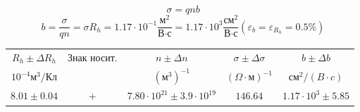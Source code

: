 \documentclass[a4paper, 12pt]{article}
\begin{document}
\begin{equation}
    \sigma = qnb
\end{equation}
\begin{equation}
    b = \frac{\sigma}{qn} = \sigma R_h = 1.17 \cdot 10^{-1}
    \frac{\text{м}^2}{\text{В} \cdot \text{с}}
    = 1.17 \cdot 10^3 \frac{\text{см}^2}{\text{В} \cdot \text{с}}
    (\varepsilon_{b} = \varepsilon_{R_h} = 0.5\%)
\end{equation}

\centering
\begin{tabular}{|c|c|c|c|c|}
    \toprule
    $R_h \pm \Delta R_h$ & Знак носит. & $n \pm \Delta n$ & $\sigma \pm \Delta \sigma$ & $b \pm \Delta b$ \\
    $10^{-4} \text{м}^3/\text{Кл}$ & & $(\text{м}^3)^{-1}$ & $(\Omega \cdot \text{м})^{-1}$ & $\text{см}^2/(B \cdot c)$ \\
    \midrule
    $8.01 \pm 0.04$ & + & $7.80 \cdot 10^{21} \pm 3.9 \cdot 10^{19}$ & $146.64$ & $1.17 \cdot 10^3 \pm 5.85$ \\
    \bottomrule
\end{tabular}
\end{document}
